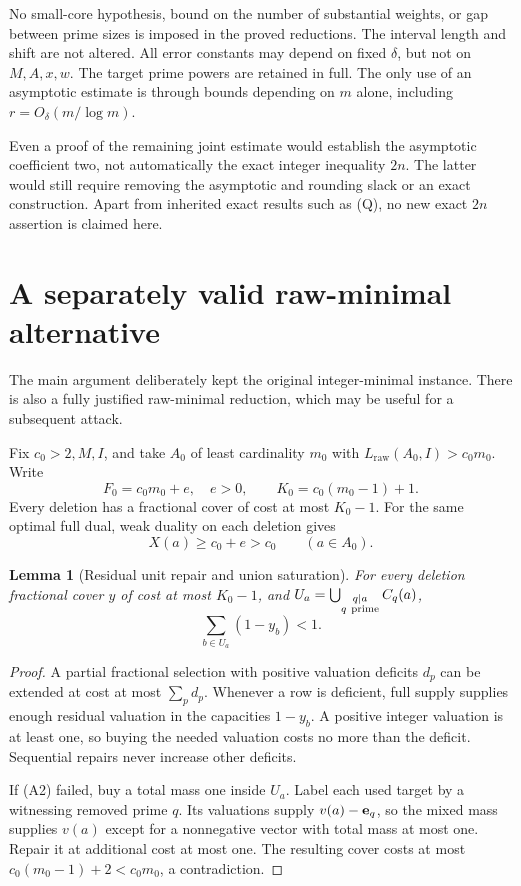 \documentclass[11pt,a4paper]{article}
\newtheorem{lemma}[theorem]{Lemma}
\theoremstyle{remark}
\newcommand{\LP}{L_{\mathrm{raw}}}
\begin{document}
No small-core hypothesis, bound on the number of substantial
weights, or gap between prime sizes is imposed in the proved
reductions. The interval length and shift are not altered.
All error constants may depend on fixed \(\delta\), but not
on \(M,A,x,w\). The target prime powers are retained in full.
The only use of an asymptotic estimate is through bounds
depending on \(m\) alone, including \(r=O_\delta(m/\log m)\).

Even a proof of the remaining joint estimate would establish
the asymptotic coefficient two, not automatically the exact
integer inequality \(2n\). The latter would still require
removing the asymptotic and rounding slack or an exact
construction. Apart from inherited exact results such as
(Q), no new exact \(2n\) assertion is claimed here.

\appendix
\section{A separately valid raw-minimal alternative}

The main argument deliberately kept the original integer-minimal
instance. There is also a fully justified raw-minimal reduction,
which may be useful for a subsequent attack.

Fix \(c_0>2,M,I\), and take \(A_0\) of least cardinality
\(m_0\) with \(\LP(A_0,I)>c_0m_0\). Write
\[
 F_0=c_0m_0+e,\quad e>0,\qquad K_0=c_0(m_0-1)+1.
\]
Every deletion has a fractional cover of cost at most \(K_0-1\).
For the same optimal full dual, weak duality on each deletion gives
\[
 X(a)\ge c_0+e>c_0\qquad(a\in A_0).
 \tag{A1}
\]

\begin{lemma}[Residual unit repair and union saturation]
For every deletion fractional cover \(y\) of cost at most \(K_0-1\),
and \(U_a=\bigcup_{\substack{q\mid a\\q\ {\rm prime}}}C_q(a)\),
\[
 \sum_{b\in U_a}(1-y_b)<1.
 \tag{A2}
\]
\end{lemma}
\begin{proof}
A partial fractional selection with positive valuation deficits
\(d_p\) can be extended at cost at most \(\sum_pd_p\).
Whenever a row is deficient, full supply supplies enough residual
valuation in the capacities \(1-y_b\). A positive integer
valuation is at least one, so buying the needed valuation costs
no more than the deficit. Sequential repairs never increase
other deficits.

If (A2) failed, buy a total mass one inside \(U_a\). Label each
used target by a witnessing removed prime \(q\).
Its valuations supply \(v(a)-{\bf e}_q\), so the mixed mass
supplies \(v(a)\) except for a nonnegative vector with total
mass at most one. Repair it at additional cost at most one.
The resulting cover costs at most
\(c_0(m_0-1)+2<c_0m_0\), a contradiction.
\end{proof}
\end{document}
